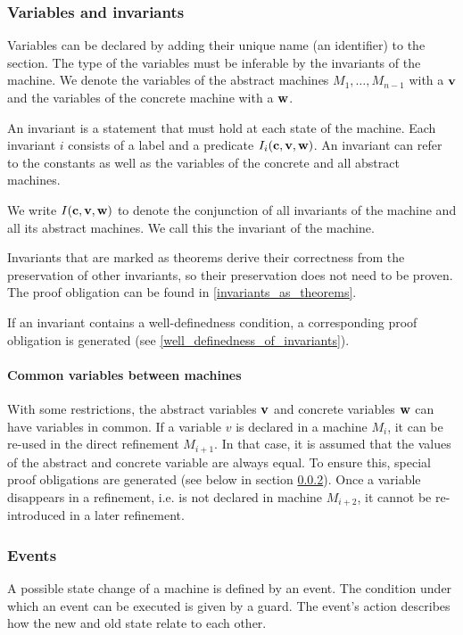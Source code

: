 \subsubsection{Variables and invariants}
\label{variables_and_invariants}
Variables can be declared by adding their unique name (an identifier) to the  section. 
The type of the variables must be inferable by the invariants of the machine.
We denote the variables of the abstract machines $M_1,\ldots,M_{n-1}$ with a $\mathbf{v}$ and the variables of the concrete machine with a $\mathbf{w}$.

An invariant is a statement that must hold at each state of the machine.
Each invariant $i$ consists of a label and a predicate $I_i(\mathbf{c},\mathbf{v},\mathbf{w})$.
An invariant can refer to the constants as well as the variables of the concrete and all abstract machines.

We write $I(\mathbf{c},\mathbf{v},\mathbf{w})$ to denote the conjunction of all invariants
of the machine and all its abstract machines. We call this the invariant of the machine.

Invariants that are marked as theorems derive their correctness from the preservation
  of other invariants, so their preservation does not need to be proven.
The proof obligation can be found in \ref{invariants_as_theorems}.

If an invariant contains a well-definedness condition, 
  a corresponding proof obligation is generated (see \ref{well_definedness_of_invariants}).

\paragraph{Common variables between machines}
\label{common_variables}
With some restrictions, the abstract variables $\mathbf{v}$ and concrete
  variables $\mathbf{w}$ can have variables in common.
If a variable $v$ is declared in a machine $M_i$, it can be re-used in the
  direct refinement $M_{i+1}$. 
In that case, it is assumed that the values of the abstract and concrete variable 
  are always equal.
To ensure this, special proof obligations are generated (see below in section \ref{events}).
Once a variable disappears in a refinement, i.e. is not declared in machine $M_{i+2}$,
  it cannot be re-introduced in a later refinement.

\subsubsection{Events}
\label{events}
A possible state change of a machine is defined by an event.
The condition under which an event can be executed is given by a guard. The event's action
describes how the new and old state relate to each other.

